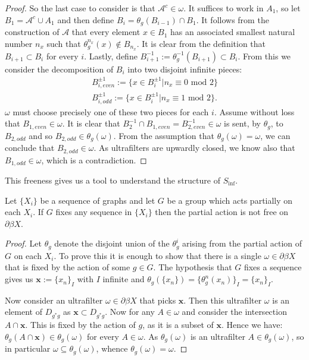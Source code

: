 \begin{proof}
So the last case to consider is that $\mathcal{A}^{c}\in \omega$. It suffices to work in $A_{1}$, so let $B_{1}=\mathcal{A}^{c}\cup A_{1}$ and then define $B_{i} = \theta_{g}(B_{i-1})\cap B_{1}$. It follows from the construction of $\mathcal{A}$ that every element $x \in B_{1}$ has an associated smallest natural number $n_{x}$ such that $\theta_{g}^{n_{x}}(x) \not \in B_{n_{x}}$. It is clear from the definition that $B_{i+1} \subset B_{i}$ for every $i$. Lastly, define $B^{-1}_{i+1}:=\theta_{g}^{-1}(B_{i+1}) \subset B_{i}$.  From this we consider the decomposition of $B_{i}$ into two disjoint infinite pieces:
\begin{eqnarray*}
B^{\pm 1}_{i,even}:= \lbrace x \in B_{i}^{\pm 1} | n_{x} \equiv 0 \mbox{ mod } 2 \rbrace \\
B^{\pm 1}_{i,odd}:= \lbrace x \in B_{i}^{\pm 1} | n_{x} \equiv 1 \mbox{ mod } 2 \rbrace.
\end{eqnarray*} 
$\omega$ must choose precisely one of these two pieces for each $i$. Assume without loss that $B_{1,even} \in \omega$. It is clear that $B^{-1}_{2} \cap B_{1,even} = B_{2,even}^{-1} \in \omega$ is sent, by $\theta_{g}$, to $B_{2,odd}$ and so $B_{2,odd} \in \theta_{g}(\omega)$. From the assumption that $\theta_{g}(\omega)=\omega$, we can conclude that $B_{2,odd} \in  \omega$. As ultrafilters are upwardly closed, we know also that $B_{1,odd} \in \omega$, which is a contradiction. 
\end{proof}

This freeness gives us a tool to understand the structure of $S_{\inf}$.

\begin{lemma}\label{Lem:CP}
Let $\lbrace X_{i} \rbrace$ be a sequence of graphs and let $G$ be a group which acts partially on each $X_{i}$. If $G$ fixes any sequence in $\lbrace X_{i} \rbrace$ then the partial action is not free on $\partial \beta X$. 
\end{lemma}
\begin{proof}Let $\theta_{g}$ denote the disjoint union of the $\theta_{g}^{i}$ arising from the partial action of $G$ on each $X_{i}$. To prove this it is enough to show that there is a single $\omega \in\partial\beta X$ that is fixed by the action of some $g \in G$. The hypothesis that $G$ fixes a sequence gives us $\textbf{x}:=\lbrace x_{n} \rbrace_{I}$ with $I$ infinite and $\theta_{g}(\lbrace x_{n} \rbrace) = \lbrace\theta_{g}^{n}(x_{n}) \rbrace_{I} =\lbrace x_{n} \rbrace_{I}$.

Now consider an ultrafilter $\omega \in \partial\beta X$ that picks $\textbf{x}$. Then this ultrafilter $\omega$ is an element of $D_{g^{*}g}$ as $\textbf{x} \subset D_{g^{*}g}$.  Now for any $A \in \omega$ and consider the intersection $A \cap \textbf{x}$. This is fixed by the action of $g$, as it is a subset of $\textbf{x}$. Hence we have: $\theta_{g}(A \cap \textbf{x}) \in \theta_{g}(\omega)$ for every $A \in \omega$. As $\theta_{g}(\omega)$ is an ultrafilter $A \in \theta_{g}(\omega)$, so in particular $\omega \subseteq \theta_{g}(\omega)$, whence $\theta_{g}(\omega)=\omega$. 
\end{proof}


